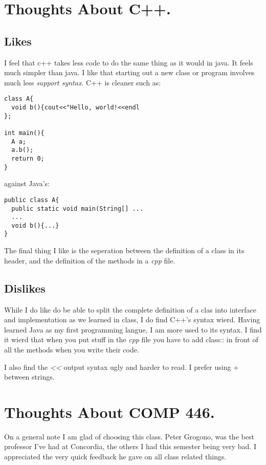 \documentclass[12pt]{article}
\begin{document}
\section{Thoughts About C++.}
\subsection{Likes}
I feel that c++ takes less code to do the same thing as it would in java.  It feels much simpler than java.  I like that starting out a new class or program involves much less \emph{support syntax}. C++ is cleaner such as:

\begin{verbatim}
class A{
  void b(){cout<<"Hello, world!<<endl
};

int main(){
  A a;
  a.b();
  return 0;
}
\end{verbatim}

against Java's:

\begin{verbatim}
public class A{
  public static void main(String[] ...
  ...
  void b(){...}
}
\end{verbatim}

The final thing I like is the seperation between the definition of a class in its header, and the definition of the methods in a \emph{cpp} file.

\subsection{Dislikes}
While I do like do be able to split the complete definition of a clas into 
interface and implementation as we learned in class, I do find C++'s syntax 
wierd.  Having learned Java as my first programming langue, I am more used to 
its syntax.  I find it wierd that when you put stuff in the \emph{cpp} file you 
have to add class:: in front of all the methods when you write their code.

I also find the \textit{<<} output syntax ugly and harder to read.  I prefer using + between strings.

\section{Thoughts About COMP 446.}

On a general note I am glad of choosing this class.  Peter Grogono, was the best professor I've had at Concordia, the others I had this semester being very bad. I appreciated the very quick feedback he gave on all class related things.
\end{document}
